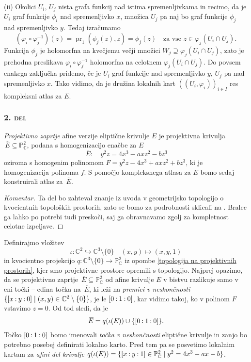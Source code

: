 \documentclass[mat1]{fmfdelo}
\numberwithin{equation}{section}
\newcommand{\C}{\mathbb C}
\newcommand{\PC}{\mathbb{P}^2_\C}
\newcommand{\oio}{\pcoor{0: 1 : 0}}
\newcommand{\inv}{^{-1}}
\newcommand{\pcoor}[1]{%
\begingroup\lccode`~=`: \lowercase{\endgroup
\edef~}{\mathbin{\mathchar\the\mathcode`:}\nobreak}%
\left[%
\begingroup
\mathcode`:=\string"8000
#1%
\endgroup
\right]%
}
\newcommand{\olsi}[1]{\,\overline{\!{#1}}} %
\DeclareMathOperator{\pr}{pr}
\theoremstyle{definition}
\newenvironment{komentar}[1][Komentar]{\begin{proof}[#1]\let\qed\relax}{\end{proof}}
\begin{document}
(ii) Okolici $U_i$, $U_j$ nista grafa funkcij nad istima spremenljivkama in recimo, da je $U_i$ graf funkcije $\phi_i$ nad spremenljivko $x$, množica $U_j$ pa naj bo graf funkcije $\phi_j$ nad spremenljivko $y$. Tedaj izračunamo
\[
    (\varphi_i \circ \varphi_j\inv)(z) = \pr_1(\phi_j(z), z) = \phi_j(z) \quad \text{za vse $z \in \varphi_j(U_i \cap U_j)$.}   
\]
Funkcija $\phi_j$ je holomorfna na kvečjemu večji množici $W_j \supseteq \varphi_j(U_i \cap U_j)$, zato je prehodna preslikava $\varphi_i \circ \varphi_j\inv$ holomorfna na celotnem $\varphi_j(U_i \cap U_j)$. Do povsem enakega zaključka pridemo, če je $U_i$ graf funkcije nad spremenljivko $y$, $U_j$ pa nad spremenljivko $x$. 
Tako vidimo, da je družina lokalnih kart $((U_i, \varphi_i))_{i \in I}$ res kompleksni atlas za $E$. 

\subsubsection*{\textsc{2. del}} 
\emph{Projektivno zaprtje} afine verzije eliptične krivulje $E$ je projektivna krivulja $\olsi{E} \subseteq \PC$, podana s homogenizacijo enačbe za $E$
\[
    \olsi{E} : \quad y^2z = 4x^3 - axz^2 - bz^3  
\]
oziroma s homogenim polinomom $F = y^2z - 4x^3 + axz^2 + bz^3$, ki je homogenizacija polinoma $f$. S pomočjo kompleksnega atlasa za $E$ bomo sedaj konstruirali atlas za $\olsi{E}$. 

\begin{komentar}
    Ta del bo zahteval znanje iz uvoda v geometrijsko topologijo o kvocientnih topoloških prostorih, zato se bomo za podrobnosti sklicali na \cite[poglavje 3.2]{MrcunTop}. Bralec ga lahko po potrebi tudi preskoči, saj ga obravnavamo zgolj za kompletnost celotne izpeljave. 
\end{komentar}

Definirajmo vložitev 
\[
    \iota: \C^2 \hookrightarrow \C^3\setminus\{0\} \quad (x,y) \mapsto (x,y,1)
\]
in kvocientno projekcijo $q : \C^3 \setminus \{0\} \to \PC$ iz opombe \ref{topologija na projektivnih prostorih}, kjer smo projektivne prostore opremili s topologijo. Najprej opazimo, da se projektivno zaprtje $\olsi{E} \subseteq \PC$ od afine krivulje $E$ v bistvu razlikuje samo v eni točki -- edina točka na $\olsi{E}$, ki leži na \emph{premici v neskončnosti} $\{\pcoor{x : y : 0} \mid (x,y) \in \C^2\setminus\{0\}\}$, je le $\oio$, kar vidimo takoj, ko v polinom $F$ vstavimo $z = 0$. Od tod sledi, da je 
\[
    \olsi{E} = q(\iota(E)) \cup \{\pcoor{0 : 1 : 0}\}.
\] 
Točko $\pcoor{0 : 1 : 0}$ bomo imenovali \emph{točka v neskončnosti} eliptične krivulje in zanjo bo potrebno posebej definirati lokalno karto. Pred tem pa se posvetimo lokalnim kartam za \emph{afini del krivulje} $q(\iota(E)) = \{ \pcoor{x : y : 1} \in \PC \mid y^2 = 4x^3 - ax - b\}$.
\end{document}
